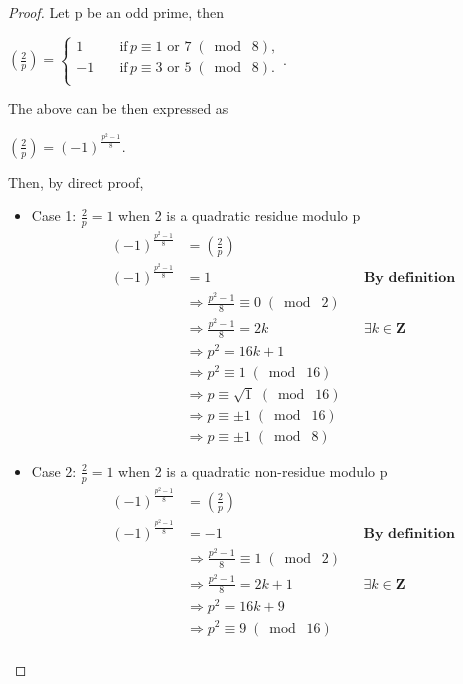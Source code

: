 \documentclass{article}
\begin{document}
\begin{proof}
Let p be an odd prime, then
\begin{center}
    $(\frac{2}{p}) = \begin{cases}
          1 \quad &\text{if} \, p \equiv 1 \text{ or } 7\;(\bmod\; 8),\\
          -1 \quad &\text{if} \, p \equiv 3 \text{ or } 5 \;(\bmod\; 8).\\
     \end{cases}$.
\end{center}
The above can be then expressed as
\begin{center}
    $(\frac{2}{p}) = (-1)^{\frac{p^2-1}{8}}$.
\end{center}
Then, by direct proof,
\begin{itemize}
    \item Case 1: $\frac{2}{p} = 1$ when 2 is a quadratic residue modulo p
    \begin{align*}
    && (-1)^{\frac{p^2-1}{8}}&= (\frac{2}{p})&&\\
    && (-1)^{\frac{p^2-1}{8}}&= 1&& \textbf{By definition}\\
    && &\Longrightarrow \frac{p^2-1}{8} \equiv 0 \;(\bmod\; 2)&&\\
    && &\Longrightarrow \frac{p^2-1}{8} = 2k&&\textbf{$\exists k\in \mathbf{Z}$}\\
    && &\Longrightarrow p^2 = 16k + 1&&\\
    && &\Longrightarrow p^2 \equiv 1 \;(\bmod\; 16) &&\\
    && &\Longrightarrow p \equiv \sqrt{1} \;(\bmod\; 16) &&\\
    && &\Longrightarrow p \equiv \pm1 \;(\bmod\; 16) &&\\
    && &\Longrightarrow p \equiv \pm1 \;(\bmod\; 8) &&
\end{align*}
    \item Case 2: $\frac{2}{p} = 1$ when 2 is a quadratic non-residue modulo p
    \begin{align*}
    && (-1)^{\frac{p^2-1}{8}}&= (\frac{2}{p})&&\\
    && (-1)^{\frac{p^2-1}{8}}&= -1 && \textbf{By definition}\\
    && &\Longrightarrow \frac{p^2-1}{8} \equiv 1 \;(\bmod\; 2)&&\\
    && &\Longrightarrow \frac{p^2-1}{8} = 2k + 1&&\textbf{$\exists k\in \mathbf{Z}$}\\
    && &\Longrightarrow p^2 = 16k + 9&&\\
    && &\Longrightarrow p^2 \equiv 9 \;(\bmod\; 16) &&\\

\end{align*}
\end{itemize}
\end{proof}
\end{document}
